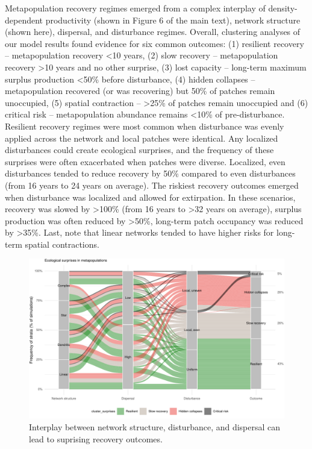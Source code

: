 \documentclass[
]{article}
\begin{document}
Metapopulation recovery regimes emerged from a complex interplay of
density-dependent productivity (shown in Figure 6 of the main text),
network structure (shown here), dispersal, and disturbance regimes.
Overall, clustering analyses of our model results found evidence for six
common outcomes: (1) resilient recovery -- metapopulation recovery
\textless10 years, (2) slow recovery -- metapopulation recovery
\textgreater10 years and no other surprise, (3) lost capacity --
long-term maximum surplus production \textless50\% before disturbance,
(4) hidden collapses -- metapopulation recovered (or was recovering) but
50\% of patches remain unoccupied, (5) spatial contraction --
\textgreater25\% of patches remain unoccupied and (6) critical risk --
metapopulation abundance remains \textless10\% of pre-disturbance.
Resilient recovery regimes were most common when disturbance was evenly
applied across the network and local patches were identical. Any
localized disturbances could create ecological surprises, and the
frequency of these surprises were often exacerbated when patches were
diverse. Localized, even disturbances tended to reduce recovery by 50\%
compared to even disturbances (from 16 years to 24 years on average).
The riskiest recovery outcomes emerged when disturbance was localized
and allowed for extirpation. In these scenarios, recovery was slowed by
\textgreater100\% (from 16 years to \textgreater32 years on average),
surplus production was often reduced by \textgreater50\%, long-term
patch occupancy was reduced by \textgreater35\%. Last, note that linear
networks tended to have higher risks for long-term spatial contractions.

\begin{figure}[H]

{\centering \includegraphics{Managing_for_ecological_surprises_in_metapopulations_files/figure-latex/cluster results-1} 

}

\caption{Interplay between network structure, disturbance, and dispersal can lead to suprising recovery outcomes.}\label{fig:cluster results}
\end{figure}
\end{document}
